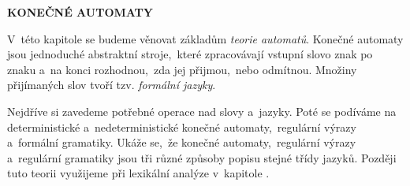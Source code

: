 \documentclass[11pt,a4paper,oneside]{article}
\begin{document}
\begin{center}
    {\huge \textbf{\MakeUppercase{Konečné automaty}}}\\[1.2cm]
\end{center}
V~této kapitole se budeme věnovat základům \emph{teorie automatů}. Konečné automaty jsou jednoduché abstraktní stroje,~které zpracovávají vstupní slovo znak po znaku a~na konci rozhodnou,~zda jej přijmou,~nebo odmítnou. Množiny přijímaných slov tvoří tzv. \emph{formální jazyky}.

Nejdříve si zavedeme potřebné operace nad slovy a~jazyky. Poté se podíváme na deterministické a~nedeterministické konečné automaty,~regulární výrazy a~formální gramatiky. Ukáže se,~že konečné automaty,~regulární výrazy a~regulární gramatiky jsou tři různé způsoby popisu stejné třídy jazyků. Později tuto teorii využijeme při lexikální analýze v~kapitole .







\end{document}
